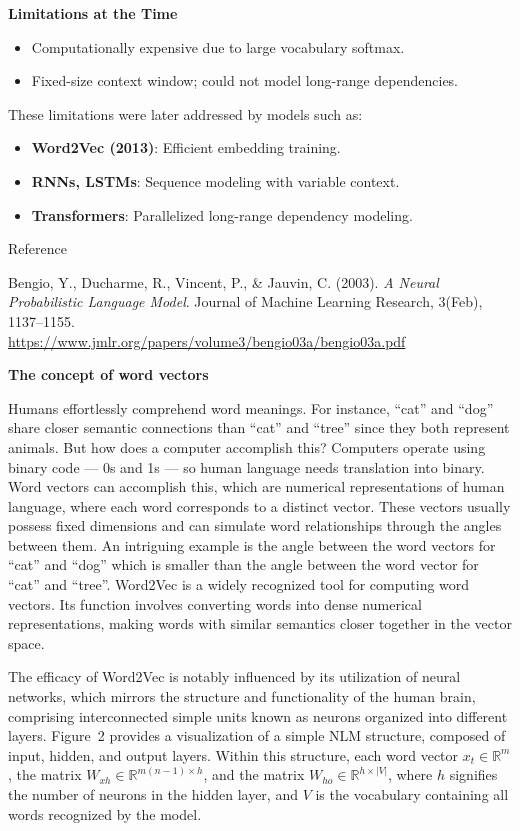 \textbf{Limitations at the Time}

\begin{itemize}
    \item Computationally expensive due to large vocabulary softmax.
    \item Fixed-size context window; could not model long-range dependencies.
\end{itemize}

These limitations were later addressed by models such as:

\begin{itemize}
    \item \textbf{Word2Vec (2013)}: Efficient embedding training.
    \item \textbf{RNNs, LSTMs}: Sequence modeling with variable context.
    \item \textbf{Transformers}: Parallelized long-range dependency modeling.
\end{itemize}

Reference

Bengio, Y., Ducharme, R., Vincent, P., \& Jauvin, C. (2003). \textit{A Neural Probabilistic Language Model}. Journal of Machine Learning Research, 3(Feb), 1137–1155. \\
\url{https://www.jmlr.org/papers/volume3/bengio03a/bengio03a.pdf}

\textbf{The concept of word vectors}

Humans effortlessly comprehend word meanings. For instance, “cat” and “dog” share closer semantic connections than “cat” and “tree” since they both represent animals. But how does a computer accomplish this? Computers operate using binary code — 0s and 1s — so human language needs translation into binary. Word vectors can accomplish this, which are numerical representations of human language, where each word corresponds to a distinct vector. These vectors usually possess fixed dimensions and can simulate word relationships through the angles between them. An intriguing example is the angle between the word vectors for “cat” and “dog” which is smaller than the angle between the word vector for “cat” and “tree”. Word2Vec is a widely recognized tool for computing word vectors. Its function involves converting words into dense numerical representations, making words with similar semantics closer together in the vector space.

The efficacy of Word2Vec is notably influenced by its utilization of neural networks, which mirrors the structure and functionality of the human brain, comprising interconnected simple units known as neurons organized into different layers. Figure~2 provides a visualization of a simple NLM structure, composed of input, hidden, and output layers. Within this structure, each word vector $x_t \in \mathbb{R}^m$, the matrix $W_{xh} \in \mathbb{R}^{m(n-1) \times h}$, and the matrix $W_{ho} \in \mathbb{R}^{h \times |V|}$, where $h$ signifies the number of neurons in the hidden layer, and $V$ is the vocabulary containing all words recognized by the model.

